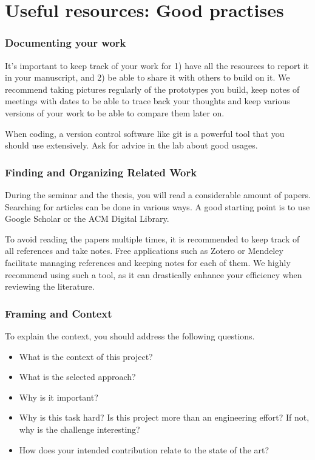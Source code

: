 
\chapter*{Useful resources: Good practises}

\subsection{Documenting your work}

It’s important to keep track of your work for 1) have all the resources to report it in your manuscript, and 2) be able to share it with others to build on it.  We recommend taking pictures regularly of the prototypes you build, keep notes of meetings with dates to be able to trace back your thoughts and keep various versions of your work to be able to compare them later on.

When coding, a version control software like git is a powerful tool that you should use extensively. Ask for advice in the lab about good usages.


\subsection{Finding and Organizing Related Work}

During the seminar and the thesis, you will read a considerable amount of papers. Searching for articles can be done in various ways. A good starting point is to use Google Scholar or the ACM Digital Library.

To avoid reading the papers multiple times, it is recommended to keep track of all references and take notes. Free applications such as Zotero or Mendeley facilitate managing references and keeping notes for each of them. We highly recommend using such a tool, as it can drastically enhance your efficiency when reviewing the literature.


\subsection{Framing and Context}

To explain the context, you should address the following questions. 
\begin{itemize}
    \item What is the context of this project?
    \item What is the selected approach?
    \item Why is it important?
    \item Why is this task hard? Is this project more than an engineering effort? If not, why is the challenge interesting?
    \item  How does your intended contribution relate to the state of the art?
\end{itemize}


